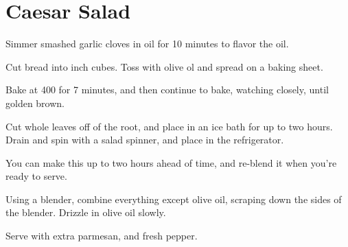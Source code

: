\section{Caesar Salad}
\begin{recipe}



Simmer smashed garlic cloves in oil for 10 minutes to flavor the oil.

Cut bread into  inch cubes. Toss with olive ol and spread on a baking sheet.

Bake at 400\degree{} for 7 minutes, and then continue to bake, watching closely, until golden brown.


Cut whole leaves off of the root, and place in an ice bath for up to two hours. Drain and spin with a salad spinner, and place in the refrigerator.


You can make this up to two hours ahead of time, and re-blend it when you're ready to serve. 

Using a blender, combine everything except olive oil, scraping down the sides of the blender. Drizzle in olive oil slowly.

Serve with extra parmesan, and fresh pepper. 

\end{recipe}
